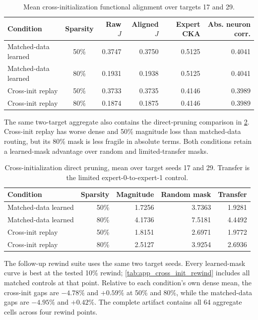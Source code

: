 \documentclass{article}
\begin{document}
\begin{table}[t]
\centering
\scriptsize
\caption{Mean cross-initialization functional alignment over targets 17 and
29.}
\label{tab:app_functional_alignment}
\begin{tabular}{@{}lcrrrr@{}}
\toprule
Condition & Sparsity & Raw $J$ & Aligned $J$ & Expert CKA & Abs. neuron corr. \\
\midrule
Matched-data learned & 50\% & 0.3747 & 0.3750 & 0.5125 & 0.4041 \\
Matched-data learned & 80\% & 0.1931 & 0.1938 & 0.5125 & 0.4041 \\
Cross-init replay & 50\% & 0.3733 & 0.3735 & 0.4146 & 0.3989 \\
Cross-init replay & 80\% & 0.1874 & 0.1875 & 0.4146 & 0.3989 \\
\bottomrule
\end{tabular}
\end{table}

The same two-target aggregate also contains the direct-pruning comparison in
\cref{tab:app_cross_init_pruning}. Cross-init replay has worse dense and 50\%
magnitude loss than matched-data routing, but its 80\% mask is less fragile in
absolute terms. Both conditions retain a learned-mask advantage over random
and limited-transfer masks.

\begin{table}[t]
\centering
\scriptsize
\caption{Cross-initialization direct pruning, mean over target seeds 17 and
29. Transfer is the limited expert-0-to-expert-1 control.}
\label{tab:app_cross_init_pruning}
\begin{tabular}{@{}lrrrr@{}}
\toprule
Condition & Sparsity & Magnitude & Random mask & Transfer \\
\midrule
Matched-data learned & 50\% & 1.7256 & 3.7363 & 1.9281 \\
Matched-data learned & 80\% & 4.1736 & 7.5181 & 4.4492 \\
Cross-init replay & 50\% & 1.8151 & 2.6971 & 1.9772 \\
Cross-init replay & 80\% & 2.5127 & 3.9254 & 2.6936 \\
\bottomrule
\end{tabular}
\end{table}

The follow-up rewind suite uses the same two target seeds. Every learned-mask
curve is best at the tested 10\% rewind; \cref{tab:app_cross_init_rewind}
includes all matched controls at that point. Relative to each condition's own
dense mean, the cross-init gaps are $-4.78\%$ and $+0.59\%$ at 50\% and 80\%,
while the matched-data gaps are $-4.95\%$ and $+0.42\%$. The complete artifact
contains all 64 aggregate cells across four rewind points.
\end{document}
